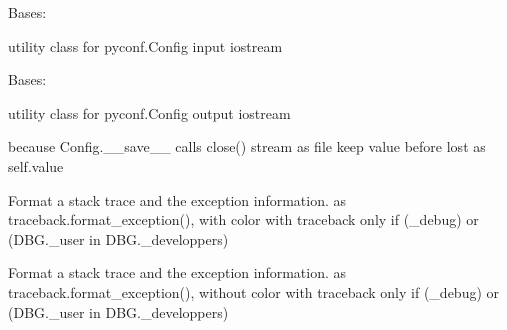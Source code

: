 \documentclass[a4paper,10pt,english]{sphinxmanual}
\begin{document}
\begin{fulllineitems}
\label{\detokenize{commands/apidoc/src:src.debug.InStream}}
Bases: 

utility class for pyconf.Config input iostream

\end{fulllineitems}


\begin{fulllineitems}
\label{\detokenize{commands/apidoc/src:src.debug.OutStream}}
Bases: 

utility class for pyconf.Config output iostream

\begin{fulllineitems}
\label{\detokenize{commands/apidoc/src:src.debug.OutStream.close}}
because Config.\_\_save\_\_ calls close() stream as file
keep value before lost as self.value

\end{fulllineitems}


\end{fulllineitems}


\begin{fulllineitems}
\label{\detokenize{commands/apidoc/src:src.debug.format_color_exception}}
Format a stack trace and the exception information.
as traceback.format\_exception(), with color
with traceback only if (\_debug) or (DBG.\_user in DBG.\_developpers)

\end{fulllineitems}


\begin{fulllineitems}
\label{\detokenize{commands/apidoc/src:src.debug.format_exception}}
Format a stack trace and the exception information.
as traceback.format\_exception(), without color
with traceback only if (\_debug) or (DBG.\_user in DBG.\_developpers)

\end{fulllineitems}
\end{document}
